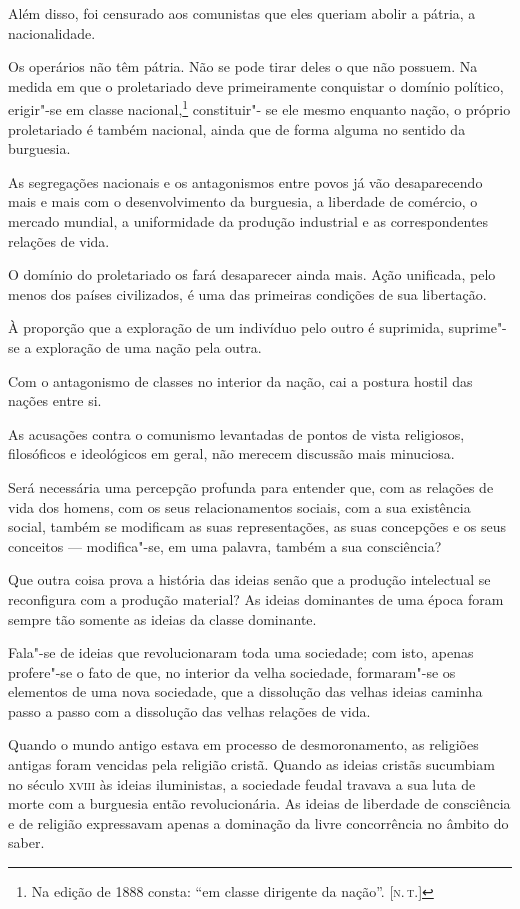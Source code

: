 Além disso, foi censurado aos comunistas que eles queriam abolir a
pátria, a nacionalidade.

Os operários não têm pátria. Não se pode tirar deles o que não
possuem. Na medida em que o proletariado deve primeiramente conquistar
o domínio político, erigir"-se em classe nacional,\footnote{ Na edição de 
1888 consta: ``em classe dirigente da nação''. [\textsc{n.\,t.}]} constituir"-
se ele mesmo enquanto nação, o próprio
proletariado é também nacional, ainda que de forma alguma no sentido da
burguesia.

As segregações nacionais e os antagonismos entre povos já vão desaparecendo
mais e mais com o desenvolvimento da burguesia, a liberdade de
comércio, o mercado mundial, a uniformidade da produção industrial
e as correspondentes relações de vida.

O domínio do proletariado os fará desaparecer ainda mais. Ação
unificada, pelo menos dos países civilizados, é uma das primeiras
condições de sua libertação.

À proporção que a exploração de um indivíduo pelo outro é suprimida,
suprime"-se a exploração de uma nação pela outra.

Com o antagonismo de classes no interior da nação, cai a postura hostil
das nações entre si.

As acusações contra o comunismo levantadas de pontos de vista
religiosos, filosóficos e ideológicos em geral, não merecem discussão
mais minuciosa.

Será necessária uma percepção profunda para entender que, com as
relações de vida dos homens, com os seus relacionamentos sociais, com a
sua existência social, também se modificam as suas representações, as
suas concepções e os seus conceitos  ---  modifica"-se, em uma palavra,
também a sua consciência?

Que outra coisa prova a história das ideias senão que a produção
intelectual se reconfigura com a produção material? As ideias
dominantes de uma época foram sempre tão somente as ideias da classe
dominante.

Fala"-se de ideias que revolucionaram toda uma sociedade; com isto,
apenas profere"-se o fato de que, no interior da velha sociedade,
formaram"-se os elementos de uma nova sociedade, que a dissolução das
velhas ideias caminha passo a passo com a dissolução das velhas
relações de vida.

Quando o mundo antigo estava em processo de desmoronamento, as religiões
antigas foram vencidas pela religião cristã. Quando as ideias cristãs
sucumbiam no século \textsc{xviii} às ideias iluministas, a sociedade feudal
travava a sua luta de morte com a burguesia então revolucionária. As
ideias de liberdade de consciência e de religião expressavam apenas a
dominação da livre concorrência no âmbito do saber.

